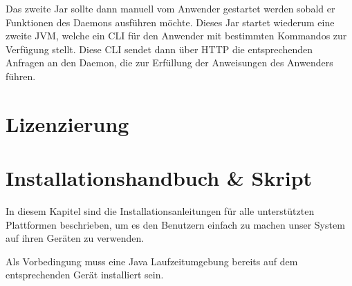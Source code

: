 \documentclass[a4paper,12pt]{report}
\begin{document}
    Das zweite Jar sollte dann manuell vom Anwender gestartet werden sobald er Funktionen des Daemons ausführen möchte.
    Dieses Jar startet wiederum eine zweite JVM, welche ein CLI für den Anwender mit bestimmten Kommandos zur Verfügung stellt.
    Diese CLI sendet dann über HTTP die entsprechenden Anfragen an den Daemon, die zur Erfüllung der Anweisungen des Anwenders führen.


    \section{Lizenzierung}


    \section{Installationshandbuch \& Skript}
    In diesem Kapitel sind die Installationsanleitungen für alle unterstützten Plattformen beschrieben, um es
    den Benutzern einfach zu machen unser System auf ihren Geräten zu verwenden.

    Als Vorbedingung muss eine Java Laufzeitumgebung bereits auf dem entsprechenden Gerät installiert sein.
\end{document}
